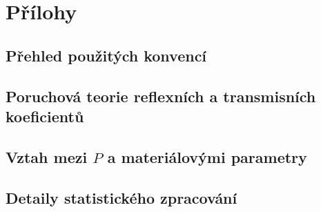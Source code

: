 \documentclass[singleside]{thesis}
\begin{document}

\tableofcontents

  

  
  
  
  
  

  


\appendix
  \chapter{Přílohy}
  \section{Přehled použitých konvencí}\label{k:dodatek konvence}
  \section{Poruchová teorie reflexních a transmisních koeficientů}\label{k:dodatek vypocet}
  \section{Vztah mezi $P$ a materiálovými parametry}
  \section{Detaily statistického zpracování}

\openright
\end{document}
